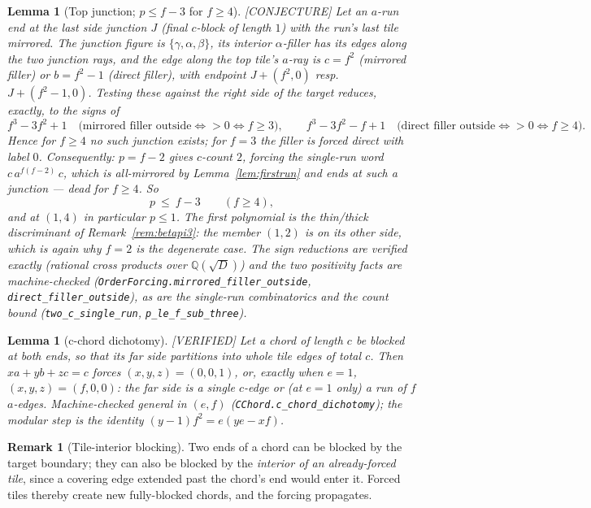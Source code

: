 \documentclass[11pt,reqno]{amsart}
\theoremstyle{plain}
\newtheorem{lemma}[theorem]{Lemma}
\theoremstyle{definition}
\newtheorem{remark}[theorem]{Remark}
\newcommand{\Q}{\mathbb{Q}}
\newcommand{\lab}[1]{\hfill\textnormal{\footnotesize\textsc{[#1]}}}
\begin{document}
\begin{lemma}[Top junction; $p\le f-3$ for $f\ge4$]\label{lem:topjunction}\lab{CONJECTURE}
Let an $a$-run end at the last side junction $J$ (final $c$-block of length $1$) with the run's last
tile mirrored. The junction figure is $\{\gamma,\alpha,\beta\}$, its interior $\alpha$-filler has
its edges along the two junction rays, and the edge along the top tile's $a$-ray is $c=f^2$
(mirrored filler) or $b=f^2-1$ (direct filler), with endpoint $J+(f^2,0)$ resp.\ $J+(f^2-1,0)$.
Testing these against the right side of the target reduces, exactly, to the signs of
\[
f^3-3f^2+1 \quad\text{(mirrored filler outside} \iff >0 \iff f\ge3\text{)},\qquad
f^3-3f^2-f+1 \quad\text{(direct filler outside} \iff >0 \iff f\ge4\text{)}.
\]
Hence for $f\ge4$ no such junction exists; for $f=3$ the filler is forced direct with label $0$.
Consequently: $p=f-2$ gives $c$-count $2$, forcing the single-run word $c\,a^{f(f-2)}\,c$, which is
all-mirrored by Lemma~\ref{lem:firstrun} and ends at such a junction — dead for $f\ge4$. So
\[
p\ \le\ f-3 \qquad (f\ge4),
\]
and at $(1,4)$ in particular $p\le1$. The first polynomial is the thin/thick discriminant of
Remark~\ref{rem:betapi3}: the member $(1,2)$ is on its other side, which is again why $f=2$ is the
degenerate case. The sign reductions are verified exactly (rational cross products over
$\Q(\sqrt D)$) and the two positivity facts are machine-checked
(\texttt{OrderForcing.mirrored\_filler\_outside}, \texttt{direct\_filler\_outside}), as are the
single-run combinatorics and the count bound (\texttt{two\_c\_single\_run},
\texttt{p\_le\_f\_sub\_three}).
\end{lemma}

\begin{lemma}[c-chord dichotomy]\label{lem:cchord}\lab{VERIFIED}
Let a chord of length $c$ be blocked at both ends, so that its far side partitions into whole tile
edges of total $c$. Then $xa+yb+zc=c$ forces $(x,y,z)=(0,0,1)$, or, exactly when $e=1$,
$(x,y,z)=(f,0,0)$: the far side is a single $c$-edge or (at $e=1$ only) a run of $f$ $a$-edges.
Machine-checked general in $(e,f)$ (\texttt{CChord.c\_chord\_dichotomy}); the modular step is the
identity $(y-1)f^2=e(ye-xf)$.
\end{lemma}

\begin{remark}[Tile-interior blocking]\label{rem:tib}
Two ends of a chord can be blocked by the target boundary; they can also be blocked by the
\emph{interior of an already-forced tile}, since a covering edge extended past the chord's end would
enter it. Forced tiles thereby create new fully-blocked chords, and the forcing propagates.
\end{remark}
\end{document}
